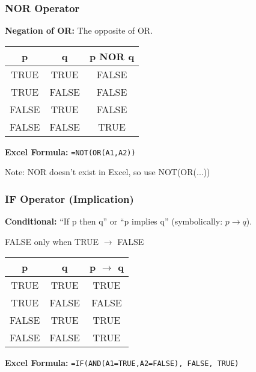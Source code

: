 \documentclass{beamer}
\begin{document}
\begin{frame}
\frametitle{NOR Operator}
\textbf{Negation of OR:} The opposite of OR.\pause

\vspace{0.3cm}
\begin{center}
\begin{tabular}{|c|c|c|}
\hline
\textbf{p} & \textbf{q} & \textbf{p NOR q} \\
\hline
TRUE & TRUE & FALSE \\
\hline
TRUE & FALSE & FALSE \\
\hline
FALSE & TRUE & FALSE \\
\hline
FALSE & FALSE & TRUE \\
\hline
\end{tabular}
\end{center}\pause

\vspace{0.3cm}
\textbf{Excel Formula:} \texttt{=NOT(OR(A1,A2))}\pause

\alert{Note:} NOR doesn't exist in Excel, so use NOT(OR(...))
\end{frame}

\begin{frame}
\frametitle{IF Operator (Implication)}
\textbf{Conditional:} ``If p then q'' or ``p implies q'' (symbolically: $p \rightarrow q$).\pause

FALSE only when TRUE $\rightarrow$ FALSE\pause

\vspace{0.3cm}
\begin{center}
\begin{tabular}{|c|c|c|}
\hline
\textbf{p} & \textbf{q} & \textbf{p $\rightarrow$ q} \\
\hline
TRUE & TRUE & TRUE \\
\hline
TRUE & FALSE & FALSE \\
\hline
FALSE & TRUE & TRUE \\
\hline
FALSE & FALSE & TRUE \\
\hline
\end{tabular}
\end{center}\pause

\vspace{0.3cm}
\textbf{Excel Formula:} \texttt{=IF(AND(A1=TRUE,A2=FALSE), FALSE, TRUE)}
\end{frame}
\end{document}
